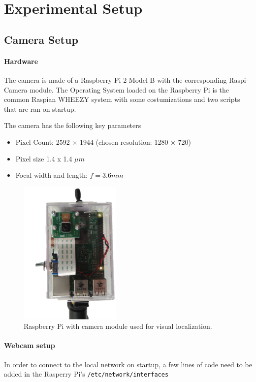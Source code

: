 \newpage
\section{Experimental Setup}

\subsection{Camera Setup}

\paragraph{Hardware} The camera is made of a Raspberry Pi 2 Model B with the corresponding Raspi-Camera module. 
The Operating System loaded on the Raspberry Pi is the common Raspian WHEEZY system with some costumizations and two scripts that are ran on startup. 

The camera has the following key parameters \cite{RaspiDoc}
\begin{itemize}
    \item Pixel Count: 2592 $\times$ 1944 (chosen resolution: 1280 $\times$ 720)
    \item Pixel size 1.4 x 1.4 $\mu m$
    \item Focal width and length: $f=3.6mm$
\end{itemize}

\begin{figure}
    \centering
    \includegraphics[width=0.25\linewidth]{files/RaspiCam.png}
    \caption{Raspberry Pi with camera module used for visual localization.}
    \label{fig:camera}
\end{figure}


\paragraph{Webcam setup} In order to connect to the local network on startup, a few lines of code need to be added in the Rasperry Pi's \texttt{/etc/network/interfaces} 

